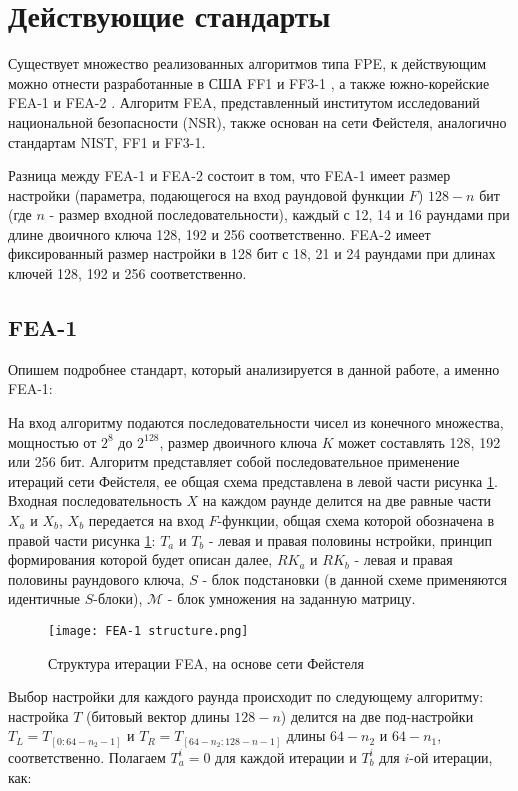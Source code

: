 \documentclass[utf8x, 14pt]{G7-32} %
\begin{document}
\section{Действующие стандарты} %
Существует множество реализованных алгоритмов типа FPE, к действующим можно отнести разработанные в США FF1 и FF3-1 \cite{FF13-1}, а также южно-корейские FEA-1 и FEA-2 \cite{FEA}.
Алгоритм FEA, представленный институтом исследований национальной безопасности (NSR), также основан на сети Фейстеля, аналогично стандартам NIST, FF1 и FF3-1. 


Разница между FEA-1 и FEA-2 состоит в том, что FEA-1 имеет размер настройки (параметра, подающегося на вход раундовой функции $F$) $128-n$ бит (где $n$ - размер входной последовательности), каждый с 12, 14 и 16 раундами при длине двоичного ключа 128, 192 и 256 соответственно. FEA-2 имеет фиксированный размер настройки в 128 бит с 18, 21 и 24 раундами при длинах ключей 128, 192 и 256 соответственно.

\subsection{FEA-1}
Опишем подробнее стандарт, который анализируется в данной работе, а именно FEA-1:

На вход алгоритму подаются последовательности чисел из конечного множества, мощностью от $2^8$ до $2^{128}$, размер двоичного ключа $K$ может составлять 128, 192 или 256 бит. Алгоритм представляет собой последовательное применение итераций сети Фейстеля, ее общая схема представлена в левой части рисунка \ref{fig:fea_structure}. Входная последовательность $X$ на каждом раунде делится на две равные части $X_a$ и $ X_b$, $X_b$ передается на вход $F$-функции, общая схема которой обозначена в правой части рисунка \ref{fig:fea_structure}: $T_a$ и $T_b$ - левая и правая половины нстройки, принцип формирования которой будет описан далее, $RK_a$ и $RK_b$ - левая и правая половины раундового ключа, $S$ - блок подстановки (в данной схеме применяются идентичные $S$-блоки), $\mathcal{M}$ - блок умножения на заданную матрицу.

\begin{figure}[h!]
	\texttt{[image: FEA-1 structure.png]}
	\caption{Структура итерации FEA, на основе сети Фейстеля}
	\label{fig:fea_structure}
\end{figure}

Выбор настройки для каждого раунда происходит по следующему алгоритму: настройка $T$ (битовый вектор длины $128-n$) делится на две под-настройки $T_L = T_{ [ 0:64-n_2-1 ] }$ и $T_R=T_{ [ 64-n_2:128-n-1 ] }$ длины $64-n_2$ и $64-n_1$, соответственно. Полагаем $T_a^i=0$ для каждой итерации и $T_b^i$ для $i$-ой итерации, как:
\end{document}
